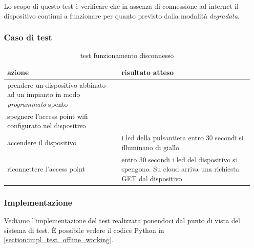 \documentclass[12pt,a4paper,twoside,titlepage]{book}
\begin{document}
Lo scopo di questo test è verificare che in assenza di connessione ad internet il
dispositivo continui a funzionare per quanto previsto dalla modalità \textit{degradata}.

\subsubsection{Caso di test}
\begin{table}
    \centering
    \begin{tabular}{| p{} | p{} |}
        \hline
        \textbf{azione} & \textbf{risultato atteso} \\ \hline 
        prendere un dispositivo abbinato ad un impianto in modo \textit{programmato} spento & \\ \hline 
        spegnere l'access point \Gls{wifi} configurato nel dispositivo & \\ \hline 
        accendere il dispositivo & i \acrshort{led} della pulsantiera entro 30 secondi si illuminano di giallo \\ \hline 
        riconnettere l'access point & entro 30 secondi i \acrshort{led} del dispositivo si spengono. Su cloud arriva una richiesta GET dal dispositivo \\ \hline
    \end{tabular}
    \caption{test funzionamento disconnesso}
\end{table}

\subsubsection{Implementazione}
Vediamo l'implementazione del test realizzata ponendoci dal punto di vista del sistema di test. 
È possibile vedere il codice Python in \autoref{section:impl_test_offline_working}.
\end{document}
